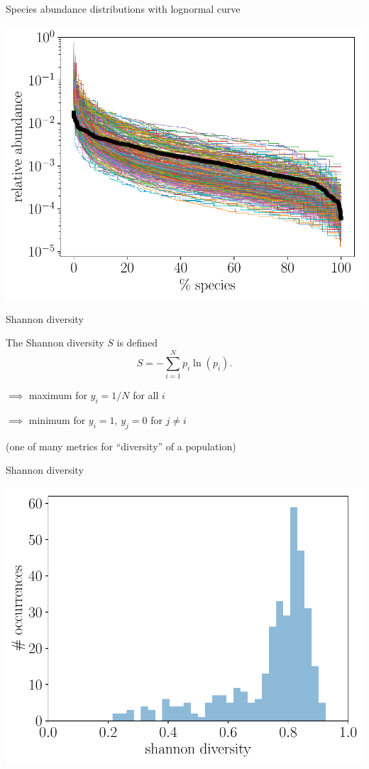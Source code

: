 \documentclass[
  ignorenonframetext,
]{beamer}
\begin{document}
\begin{frame}{Species abundance distributions with lognormal curve}
\protect\hypertarget{species-abundance-distributions-with-lognormal-curve}{}

\includegraphics[width=\linewidth]{figs/species_abundance_curve_5.pdf}

\end{frame}

\begin{frame}{Shannon diversity}
\protect\hypertarget{shannon-diversity}{}

\Large The Shannon diversity \(S\) is defined
\[S = -\sum_{i=1}^N p_i \ln(p_i).\]

\normalsize

\(\implies\) maximum for \(y_i = 1/N\) for all \(i\)

\(\implies\) minimum for \(y_i = 1\), \(y_j = 0\) for \(j \neq i\)

(one of many metrics for ``diversity'' of a population)

\end{frame}

\begin{frame}{Shannon diversity}
\protect\hypertarget{shannon-diversity-1}{}

\includegraphics[width=\linewidth]{figs/shannon_div_0}

\end{frame}
\end{document}
